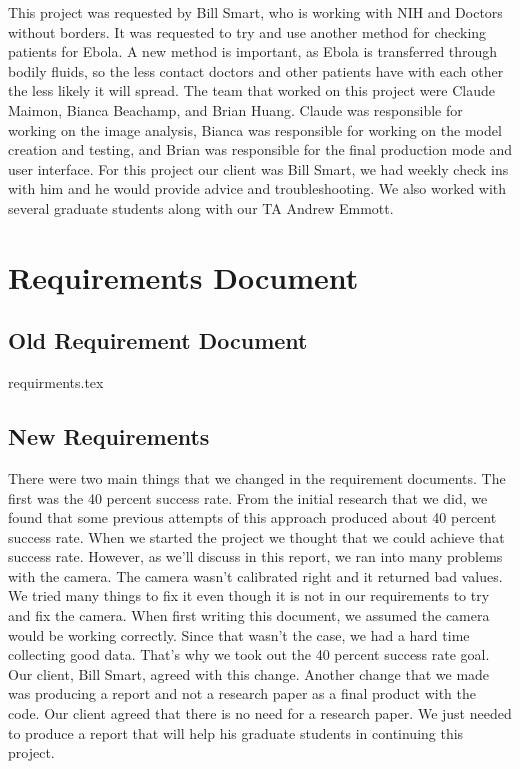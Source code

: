 \documentclass[onecolumn, draftclsnofoot,10pt, compsoc]{IEEEtran}
\begin{document}
	This project was requested by Bill Smart, who is working with NIH and Doctors without borders. It was requested to try and use another method for checking patients for Ebola. A new method is important, as Ebola is transferred through bodily fluids, so the less contact doctors and other patients have with each other the less likely it will spread. The team that worked on this project were Claude Maimon, Bianca Beachamp, and Brian Huang. Claude was responsible for working on the image analysis, Bianca was responsible for working on the model creation and testing, and Brian was responsible for the final production mode and user interface. For this project our client was Bill Smart, we had weekly check ins with him and he would provide advice and troubleshooting. We also worked with several graduate students along with our TA Andrew Emmott.
		
	\section{Requirements Document}
	\subsection{Old Requirement Document}
	{requirments.tex}
	\subsection{New Requirements}
	There were two main things that we changed in the requirement documents. The first was the 40 percent success rate. From the initial research that we did, we found that some previous attempts of this approach produced about 40 percent success rate. When we started the project we thought that we could achieve that success rate. However, as we'll discuss in this report, we ran into many problems with the camera. The camera wasn't calibrated right and it returned bad values. We tried many things to fix it even though it is not in our requirements to try and fix the camera. When first writing this document, we assumed the camera would be working correctly. Since that wasn't the case, we had a hard time collecting good data. That's why we took out the 40 percent  success rate goal. Our client, Bill Smart, agreed with this change. Another change that we made was producing a report and not a research paper as a final product with the code. Our client agreed that there is no need for a research paper. We just needed to produce a report that will help his graduate students in continuing this project. 
\end{document}

